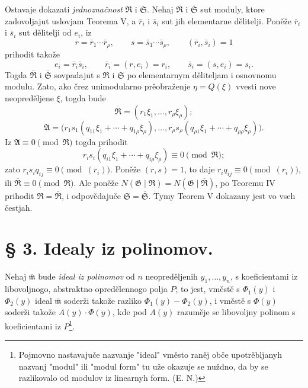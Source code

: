 \documentclass[11pt]{article}
\providecommand{\Amod}{\mathfrak A}
\providecommand{\Gmod}{\mathfrak G}
\providecommand{\Rmod}{\mathfrak R}
\providecommand{\Smod}{\mathfrak S}
\providecommand{\mideal}{\mathfrak m}
\providecommand{\zero}[1]{\equiv 0\pmod{#1}}
\providecommand{\Norm}{N}
\begin{document}
Ostavaje dokazati \emph{jednoznačnost} $\Rmod$ i $\Smod$. Nehaj $\overline{\Rmod}$ i $\overline{\Smod}$ sut moduly, ktore zadovoljajut uslovjam Teorema V, a $\bar r_i$ i $\bar s_i$ sut jih elementarne dělitelji. Poněže $\bar r_i$ i $\bar s_i$ sut dělitelji od $e_i$, iz
\[
 r=\bar r_1\cdots\bar r_\rho,
 \qquad
 s=\bar s_1\cdots\bar s_\rho,
 \qquad
 (\bar r_i,\bar s_i)=1
\]
prihodit takože
\[
 e_i=\bar r_i\bar s_i,
 \qquad
 \bar r_i=(r,e_i)=r_i,
 \qquad
 \bar s_i=(s,e_i)=s_i.
\]
Togda $\overline{\Rmod}$ i $\overline{\Smod}$ sovpadajut s $\Rmod$ i $\Smod$ po elementarnym děliteljam i osnovnomu modulu. Zato, ako črez unimodularno prěobraženje $\eta=Q(\xi)$ vvesti nove neopreděljene $\xi$, togda bude
\[
 \overline{\Rmod}=(r_1\xi_1,\ldots,r_\rho\xi_\rho);
\]
\[
 \Amod=\bigl(r_1s_1(q_{11}\xi_1+\cdots+q_{1\rho}\xi_\rho),\ldots,
 r_\rho s_\rho(q_{\rho1}\xi_1+\cdots+q_{\rho\rho}\xi_\rho)\bigr).
\]
Iz $\Amod\zero{\Rmod}$ togda prihodit
\[
 r_i s_i(q_{i1}\xi_1+\cdots+q_{i\rho}\xi_\rho)\zero{\Rmod};
\]
zato $r_is_iq_{ij}\zero{(r_i)}$. Poněže $(r,s)=1$, to daje $r_iq_{ij}\zero{(r_i)}$, ili $\overline{\Rmod}\zero{\Rmod}$. Ale poněže $\Norm(\Gmod\mid\Rmod)=\Norm(\Gmod\mid\overline{\Rmod})$, po Teoremu IV prihodit $\Rmod=\overline{\Rmod}$, i odpovědajuče $\Smod=\overline{\Smod}$. Tymy Teorem V dokazany jest vo vseh čestjah.


\section*{§ 3. Idealy iz polinomov.}

Nehaj $\overline{\mideal}$ bude {\itshape ideal iz polinomov} od $n$ neopreděljenih $y_1,\ldots,y_n$, s koeficientami iz libovoljnogo, abstraktno opredělennogo polja $P$; to jest, vměstě s $\Phi_1(y)$ i $\Phi_2(y)$ ideal $\overline{\mideal}$ soderži takože razliko $\Phi_1(y)-\Phi_2(y)$, i vměstě s $\Phi(y)$ soderži takože $A(y)\cdot\Phi(y)$, kde pod $A(y)$ razuměje se libovoljny polinom s koeficientami iz $P$\footnote{Pojmovno nastavajuče nazvanje "ideal" vměsto raněj obče upotrěbljanyh nazvanj "modul" ili "modul form" tu uže okazuje se nuždno, da by se razlikovalo od modulov iz linearnyh form. (E. N.)}.
\end{document}
